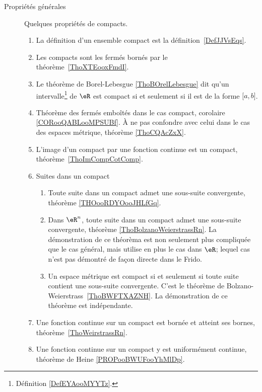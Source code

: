         \label{THEMEooQQBHooLcqoKB}
    \begin{description}

        \item[Propriétés générales]

            Quelques propriétés de compacts.

                \begin{enumerate}
    \item
        La définition d'un ensemble compact est la définition~\ref{DefJJVsEqs}.
    \item
        Les compacts sont les fermés bornés par le théorème~\ref{ThoXTEooxFmdI}.
    \item
        Le théorème de Borel-Lebesgue \ref{ThoBOrelLebesgue} dit qu'un intervalle\footnote{Définition \ref{DefEYAooMYYTz}.} de \( \eR\) est compact si et seulement si il est de la forme \( \mathopen[ a , b \mathclose]\).
    \item
        Théorème des fermés emboîtés dans le cas compact, corolaire \ref{CORooQABLooMPSUBf}. À ne pas confondre avec celui dans le cas des espaces métrique, théorème \ref{ThoCQAcZxX}.
    \item
        L'image d'un compact par une fonction continue est un compact, théorème~\ref{ThoImCompCotComp}.
    \item
        Suites dans un compact
        \begin{enumerate}
            \item
                Toute suite dans un compact admet une sous-suite convergente, théorème \ref{THOooRDYOooJHLfGq}.
            \item
                Dans \( \eR^n\), toute suite dans un compact admet une sous-suite convergente, théorème \ref{ThoBolzanoWeierstrassRn}. La démonstration de ce théorèma est non seulement plus compliquée que le cas général, mais utilise en plus le cas dans \( \eR\); lequel cas n'est pas démontré de façon directe dans le Frido.
            \item
                Un espace métrique est compact si et seulement si toute suite contient une sous-suite convergente. C'est le théorème de Bolzano-Weierstrass~\ref{ThoBWFTXAZNH}. La démonstration de ce théorème est indépendante.
        \end{enumerate}
    \item
        Une fonction continue sur un compact est bornée et atteint ses bornes, théorème~\ref{ThoWeirstrassRn}.
    \item
        Une fonction continue sur un compact y est uniformément continue, théorème de Heine \ref{PROPooBWUFooYhMlDp}.
                \end{enumerate}


\end{description}
